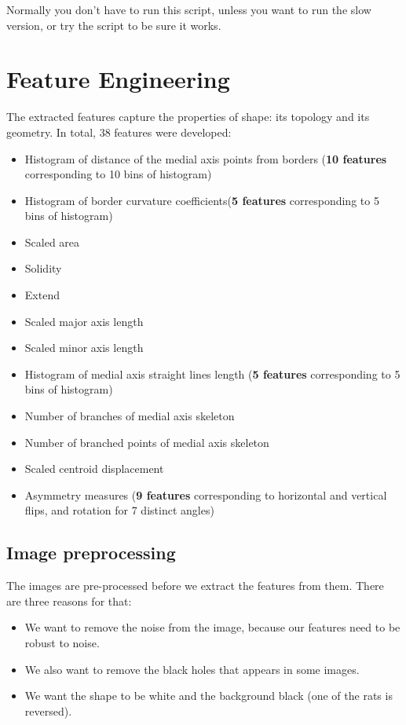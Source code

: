 \documentclass[12pt]{article}
\begin{document}
Normally you don't have to run this script, unless you want to run the slow version, or try the script to be sure it works.

\section{Feature Engineering}

The extracted features capture the properties of shape: its topology and its geometry. In total, 38 features were developed:

\begin{itemize}
	\item Histogram of distance of the medial axis points from borders (\textbf{10 features} corresponding to 10 bins of histogram)
	\item Histogram of border curvature coefficients(\textbf{5 features} corresponding to 5 bins of histogram)
	\item Scaled area
	\item Solidity
	\item Extend
	\item Scaled major axis length
	\item Scaled minor axis length
	\item Histogram of medial axis straight lines length (\textbf{5 features} corresponding to 5 bins of histogram)
	\item Number of branches of medial axis skeleton
	\item Number of branched points of medial axis skeleton
	\item Scaled centroid displacement
	\item Asymmetry measures (\textbf{9 features} corresponding to horizontal and vertical flips, and rotation for 7 distinct angles)
\end{itemize} 

\subsection{Image preprocessing}
The images are pre-processed before we extract the features from them. There are three reasons for that:
\begin{itemize}
	\item We want to remove the noise from the image, because our features need to be robust to noise.
        \item We also want to remove the black holes that appears in some images.
        \item We want the shape to be white and the background black (one of the rats is reversed).
\end{itemize}
\end{document}

